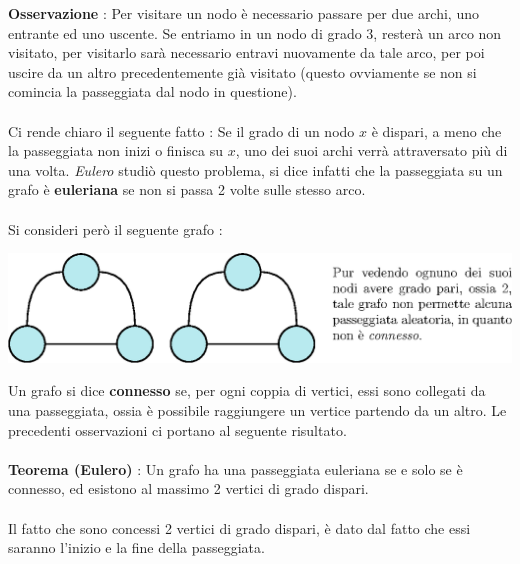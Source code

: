 \documentclass[12pt, letterpaper]{article}
\newcommand{\acc}{\\\hphantom{}\\}
\begin{document}
\textbf{Osservazione} : Per visitare un nodo è necessario passare per due archi, uno entrante ed uno uscente.
Se entriamo in un nodo di grado 3, resterà un arco non visitato, per visitarlo sarà necessario entravi nuovamente
da tale arco, per poi uscire da un altro precedentemente già visitato (questo ovviamente se non si comincia la
passeggiata dal nodo in questione).\acc
Ci rende chiaro il seguente fatto : Se il grado di un nodo $x$ è dispari, a meno che la passeggiata non inizi
o finisca su $x$, uno dei suoi archi verrà attraversato più di una volta. \textit{Eulero} studiò questo problema,
si dice infatti che la passeggiata su un grafo è \textbf{euleriana} se non si passa 2 volte sulle stesso arco.\acc
Si consideri però il seguente grafo :\begin{center}
    \includegraphics[width=1\textwidth ]{images/nonConnesso.eps}
\end{center}
Un grafo si dice \textbf{connesso} se, per ogni coppia di vertici, essi sono collegati da una passeggiata,
ossia è possibile raggiungere un vertice partendo da un altro. Le precedenti osservazioni ci portano al
seguente risultato.\acc
\textbf{Teorema (Eulero)} : Un grafo ha una passeggiata euleriana se e solo se è connesso, ed
esistono al massimo 2 vertici di grado dispari.\acc
Il fatto che sono concessi 2 vertici di grado dispari, è dato dal fatto che essi saranno l'inizio e la fine
della passeggiata.
\end{document}
